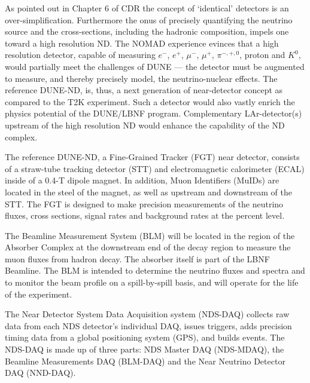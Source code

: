 As pointed out in Chapter 6 of CDR \volphys %
the concept of `identical' detectors is an over-simplification.
Furthermore the onus of precisely quantifying the neutrino source and
the cross-sections, including the hadronic composition, impels one
toward a high resolution ND. The NOMAD experience evinces that a high
resolution detector, capable of measuring $e^{-}$, $e^{+}$, $\mu^{-}$,
$\mu^{+}$, $\pi^{-,+,0}$, proton and $K^{0}$, would partially meet the
challenges of DUNE --- the detector must be augmented to measure, and
thereby precisely model, the neutrino-nuclear effects. The reference
DUNE-ND, is, thus, a next generation of near-detector concept as
compared to the T2K experiment. Such a detector would also vastly
enrich the physics potential of the DUNE/LBNF program.  Complementary
LAr-detector(s) upstream of the high resolution ND would enhance the
capability of the ND complex.


The reference DUNE-ND, a Fine-Grained Tracker (FGT) near detector,
consists of a straw-tube tracking detector (STT) and electromagnetic
calorimeter (ECAL) inside of a 0.4-T dipole magnet. In addition, Muon
Identifiers (MuIDs) are located in the steel of the magnet, as well as
upstream and downstream of the STT. The FGT is designed to make
precision measurements of the neutrino fluxes, cross sections, signal
rates and background rates at the percent level.

The Beamline Measurement System (BLM) will be located in the region of
the Absorber Complex at the downstream end of the decay region to
measure the muon fluxes from hadron decay. The absorber itself is part
of the LBNF Beamline.  The BLM is intended to determine the neutrino
fluxes and spectra and to monitor the beam profile on a spill-by-spill
basis, and will operate for the life of the experiment.

The Near Detector System Data Acquisition system (NDS-DAQ) collects
raw data from each NDS detector's individual DAQ, issues triggers,
adds precision timing data from a global positioning system (GPS), and
builds events.  The NDS-DAQ is made up of three parts: NDS Master DAQ
(NDS-MDAQ), the Beamline Measurements DAQ (BLM-DAQ) and the Near
Neutrino Detector DAQ (NND-DAQ).





